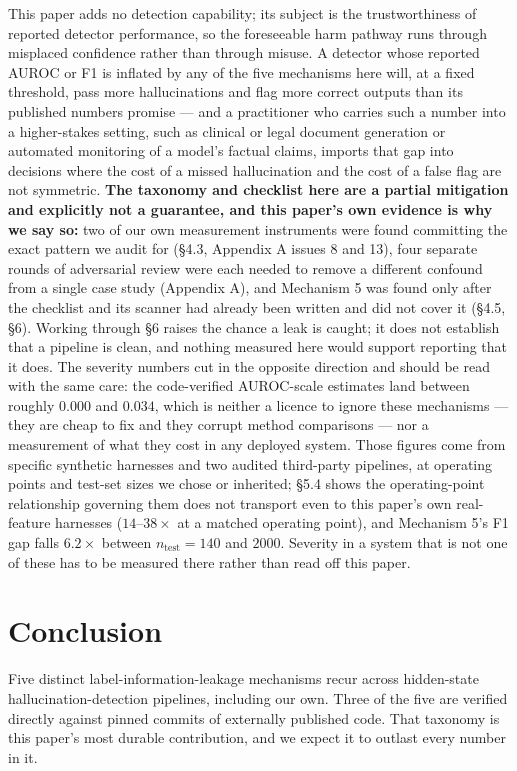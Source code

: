 \documentclass[10pt]{article} %
\begin{document}
This paper adds no detection capability; its subject is the trustworthiness of
reported detector performance, so the foreseeable harm pathway runs through
misplaced confidence rather than through misuse. A detector whose reported
AUROC or F1 is inflated by any of the five mechanisms here will, at a fixed
threshold, pass more hallucinations and flag more correct outputs than its
published numbers promise --- and a practitioner who carries such a number into
a higher-stakes setting, such as clinical or legal document generation or
automated monitoring of a model's factual claims, imports that gap into
decisions where the cost of a missed hallucination and the cost of a false flag
are not symmetric. \textbf{The taxonomy and checklist here are a partial
mitigation and explicitly not a guarantee, and this paper's own evidence is why
we say so:} two of our own measurement instruments were found committing the
exact pattern we audit for (§4.3, Appendix A issues 8 and 13), four separate rounds
of adversarial review were each needed to remove a different confound from a
single case study (Appendix A), and Mechanism 5 was found only after the
checklist and its scanner had already been written and did not cover it (§4.5,
§6). Working through §6 raises the chance a leak is caught; it does not
establish that a pipeline is clean, and nothing measured here would support
reporting that it does. The severity numbers cut in the opposite direction and
should be read with the same care: the code-verified AUROC-scale estimates land
between roughly $0.000$ and $0.034$, which is neither a licence to ignore these
mechanisms --- they are cheap to fix and they corrupt method comparisons --- nor
a measurement of what they cost in any deployed system. Those figures come from
specific synthetic harnesses and two audited third-party pipelines, at operating
points and test-set sizes we chose or inherited; §5.4 shows the operating-point
relationship governing them does not transport even to this paper's own
real-feature harnesses ($14$--$38\times$ at a matched operating point), and
Mechanism 5's F1 gap falls $6.2\times$ between $n_{\text{test}}=140$ and
$2000$. Severity in a system that is not one of these has to be measured there
rather than read off this paper.

\section{Conclusion}

Five distinct label-information-leakage mechanisms recur across hidden-state
hallucination-detection pipelines, including our own. Three of the five are
verified directly against pinned commits of externally published code. That
taxonomy is this paper's most durable contribution, and we expect it to outlast
every number in it.
\end{document}
